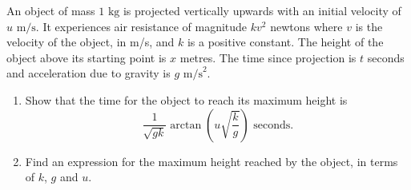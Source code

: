 \begin{problem}
An object of mass $1 \text{ kg}$ is projected vertically upwards with an initial velocity of $u \text{ m/s}$. It experiences air resistance of magnitude $kv^2$ newtons where $v$ is the velocity of the object, in m/s, and $k$ is a positive constant. The height of the object above its starting point is $x$ metres. The time since projection is $t$ seconds and acceleration due to gravity is $g \text{ m/s}^2$.

\begin{enumerate}[label=(\roman*)]
    \item Show that the time for the object to reach its maximum height is 
    \[
    \frac{1}{\sqrt{gk}}\arctan\left(u\sqrt{\frac{k}{g}}\right) \text{ seconds.}
    \]
    \item Find an expression for the maximum height reached by the object, in terms of $k$, $g$ and $u$.
\end{enumerate}
\end{problem}



